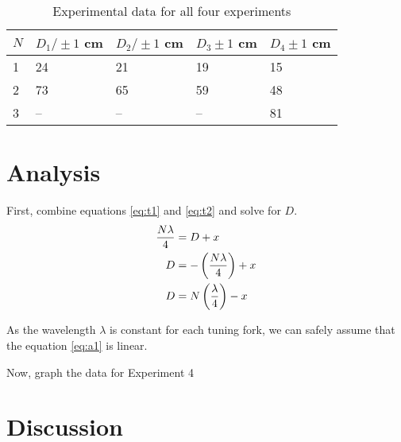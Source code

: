 \documentclass{article}
\numberwithin{equation}{section}
\begin{document}
\begin{table}[!h]
  \centering
  \begin{tabular}{|l|l|l|l|l|}
    \hline
    \(N\) & \(D_1 / \pm 1\) \si{cm} & \(D_2 / \pm 1\) \si{cm} & \(D_3 \pm 1\) \si{cm} & \(D_4 \pm 1\) \si{cm} \\
    \hline
    1  & 24  & 21  & 19  & 15 \\
    2  & 73  & 65  & 59  & 48 \\
    3  & --  & --  & --  & 81 \\
    \hline
  \end{tabular}
  \caption{Experimental data for all four experiments}
  \label{table:d3}
\end{table}

\section{Analysis}
First, combine equations \eqref{eq:t1} and \eqref{eq:t2} and solve for \(D\).
\begin{align} \label{eq:a1}
  \frac{N \lambda}{4} &= D + x \notag \\
  D &= - \left (\frac{N \lambda}{4} \right) + x \notag \\
  D &= N \left(\frac{\lambda}{4} \right) - x
\end{align}

As the wavelength \(\lambda\) is constant for each tuning fork, we can safely assume that the equation \eqref{eq:a1} is linear.

Now, graph the data for Experiment 4

\section{Discussion}
\end{document}
